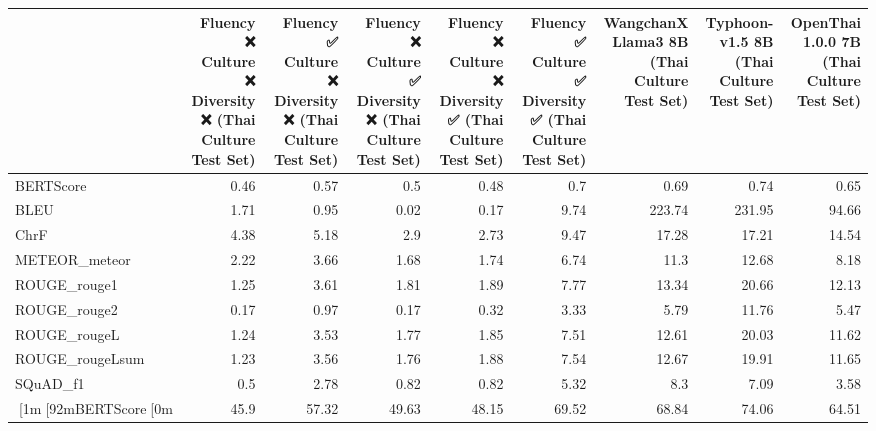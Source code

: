 \begin{tabular}{lrrrrrrrr}
\hline
                 &       Fluency ❌
 Culture ❌
 Diversity ❌
(Thai Culture Test Set) &       Fluency ✅
 Culture ❌
 Diversity ❌
(Thai Culture Test Set) &       Fluency ❌
 Culture ✅
 Diversity ❌
(Thai Culture Test Set) &       Fluency ❌
 Culture ❌
 Diversity ✅
(Thai Culture Test Set) &       Fluency ✅
 Culture ✅
 Diversity ✅
(Thai Culture Test Set) &        WangchanX Llama3 8B
(Thai Culture Test Set) &        Typhoon-v1.5 8B
(Thai Culture Test Set) &       OpenThai 1.0.0 7B
(Thai Culture Test Set) \\
\hline
 BERTScore       &  0.46 &  0.57 &  0.5  &  0.48 &  0.7  &   0.69 &   0.74 &  0.65 \\
 BLEU            &  1.71 &  0.95 &  0.02 &  0.17 &  9.74 & 223.74 & 231.95 & 94.66 \\
 ChrF            &  4.38 &  5.18 &  2.9  &  2.73 &  9.47 &  17.28 &  17.21 & 14.54 \\
 METEOR_meteor   &  2.22 &  3.66 &  1.68 &  1.74 &  6.74 &  11.3  &  12.68 &  8.18 \\
 ROUGE_rouge1    &  1.25 &  3.61 &  1.81 &  1.89 &  7.77 &  13.34 &  20.66 & 12.13 \\
 ROUGE_rouge2    &  0.17 &  0.97 &  0.17 &  0.32 &  3.33 &   5.79 &  11.76 &  5.47 \\
 ROUGE_rougeL    &  1.24 &  3.53 &  1.77 &  1.85 &  7.51 &  12.61 &  20.03 & 11.62 \\
 ROUGE_rougeLsum &  1.23 &  3.56 &  1.76 &  1.88 &  7.54 &  12.67 &  19.91 & 11.65 \\
 SQuAD_f1        &  0.5  &  2.78 &  0.82 &  0.82 &  5.32 &   8.3  &   7.09 &  3.58 \\
 [1m[92mBERTScore[0m       & 45.9  & 57.32 & 49.63 & 48.15 & 69.52 &  68.84 &  74.06 & 64.51 \\
\hline
\end{tabular}

